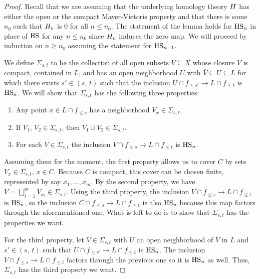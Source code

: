 \begin{proof}
	Recall that we are assuming that the underlying homology theory $H$ has either the open or the compact Mayer-Vietoris property and that there is some $n_0$ such that $H_{n}$ is 0 for all $n \leq n_0$.
    The statement of the lemma holds for $\mathrm{HS}_{n}$ in place of $\mathrm{HS}$ for any $n \leq n_0$ since $H_{n}$ induces the zero map.
    We will proceed by induction on $n \geq n_0$ assuming the statement for $\mathrm{HS}_{n-1}$.

    We define $\Sigma_{s, t}$ to be the collection of all open subsets $V \subseteq X$ whose closure $\overline{V}$ is compact, contained in $L$, and has an open neighborhood $U$ with 
	$\overline{V} \subseteq U \subseteq L$
	for which there exists $s' \in (s,\, t)$ such that the inclusion
    $U \cap f_{\leq s'} \to L \cap f_{\leq t}$
	is $\mathrm{HS}_n$.
	We will show that $\Sigma_{s, t}$ has the following three properties:
	\begin{enumerate}
	    \item Any point $x \in L \cap f_{\leq s}$ has a neighborhood $V_x \in \Sigma_{s,t}$.
	    \item If $V_1,\, V_2 \in \Sigma_{s,t}$, then $V_1 \cup V_2 \in \Sigma_{s,t}$.
	    \item For each $V \in \Sigma_{s,t}$ the inclusion 
	    $V \cap f_{\leq s} \to L \cap f_{\leq t}$ 
	    is $\mathrm{HS}_n$.
	\end{enumerate}
	
	Assuming them for the moment, the first property allows us to cover $C$ by sets $V_x \in \Sigma_{s,t}$, $x \in C$.
	Because $C$ is compact, this cover can be chosen finite, represented by say $x_1,\dots, x_m$.
	By the second property, we have $V = \bigcup_{i = 1}^m V_{x_i} \in \Sigma_{s,t}$.
	Using the third property, the inclusion 
	$V \cap f_{\leq s} \to L \cap f_{\leq t}$ 
	is $\mathrm{HS}_n$, so the inclusion 
	$C \cap f_{\leq s} \to L \cap f_{\leq t}$ 
	is also $\mathrm{HS}_n$ because this map factors through the aforementioned one.
	What is left to do is to show that $\Sigma_{s,t}$ has the properties we want.
	
	For the third property, let $V \in \Sigma_{s,t}$ with $U$ an open neighborhood of $\overline{V}$ in $L$ and $s' \in (s,\, t)$ such that 
	$U \cap f_{\leq s'} \to L \cap f_{\leq t}$
	is $\mathrm{HS}_n$.
	The inclusion
	$V \cap f_{\leq s} \to L \cap f_{\leq t}$
	factors through the previous one %
	so it is $\mathrm{HS}_n$ as well.
	Thus, $\Sigma_{s, t}$ has the third property we want.
	

\end{proof}
